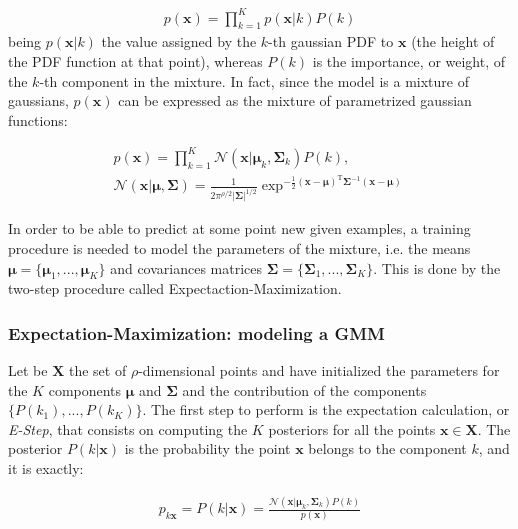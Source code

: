 \documentclass[10pt,twocolumn,letterpaper]{article}
\begin{document}
\begin{gather}
	p(\mathbf{x}) = \prod_{k=1}^{K} p(\mathbf{x}|k) P(k)
\end{gather}
being $p(\mathbf{x}|k)$ the value assigned by the $k$-th gaussian PDF to $\mathbf{x}$ (the height of the PDF function at that point), whereas $P(k)$ is the importance, or weight, of the $k$-th component in the mixture. In fact, since the model is a mixture of gaussians, $p(\mathbf{x})$ can be expressed as the mixture of parametrized gaussian functions:

\begin{gather}
	p(\mathbf{x}) = \prod_{k=1}^{K} \mathcal{N}(\mathbf{x}|\boldsymbol{\mu}_{k}, \mathbf{\Sigma}_{k}) P(k), \\
	\mathcal{N}(\mathbf{x}|\boldsymbol{\mu},\mathbf{\Sigma}) = \frac{1}{2\pi^{\rho/2}|\mathbf{\Sigma}|^{1/2}} \exp^{-\frac{1}{2} (\mathbf{x}-\boldsymbol{\mu})^\mathrm{T} \mathbf{\Sigma}^{-1} (\mathbf{x}-\boldsymbol{\mu}) }
\end{gather}

In order to be able to predict at some point new given examples, a training procedure is needed to model the parameters of the mixture, i.e. the means $\boldsymbol{\mu} = \{ \mathbf{\boldsymbol{\mu}}_1, ..., \boldsymbol{\mu}_K \}$ and covariances matrices $\mathbf{\Sigma} = \{ \mathbf{\Sigma}_1, ..., \mathbf{\Sigma}_K \}$. This is done by the two-step procedure called Expectaction-Maximization.

\subsubsection{Expectation-Maximization: modeling a GMM}

Let be $\mathbf{X}$ the set of $\rho$-dimensional points and have initialized the parameters for the $K$ components $\boldsymbol{\mu}$ and $\mathbf{\Sigma}$ and the contribution of the components $\{P(k_1), ..., P(k_K)\}$. The first step to perform is the expectation calculation, or \emph{E-Step}, that consists on computing the $K$ posteriors for all the points $\mathbf{x} \in \mathbf{X}$. The posterior $P(k|\mathbf{x})$ is the probability the point $\mathbf{x}$ belongs to the component $k$, and it is exactly:

\begin{gather}
	p_{k\mathbf{x}} = P(k|\mathbf{x}) = \frac{\mathcal{N}(\mathbf{x}|\boldsymbol{\mu}_{k}, \mathbf{\Sigma}_{k}) P(k)}{p(\mathbf{x})}
\end{gather}
\end{document}
